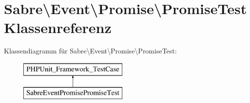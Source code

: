 \hypertarget{class_sabre_1_1_event_1_1_promise_1_1_promise_test}{}\section{Sabre\textbackslash{}Event\textbackslash{}Promise\textbackslash{}Promise\+Test Klassenreferenz}
\label{class_sabre_1_1_event_1_1_promise_1_1_promise_test}
Klassendiagramm für Sabre\textbackslash{}Event\textbackslash{}Promise\textbackslash{}Promise\+Test\+:\begin{figure}[H]
\begin{center}
\leavevmode
\includegraphics[height=2.000000cm]{class_sabre_1_1_event_1_1_promise_1_1_promise_test}
\end{center}
\end{figure}
